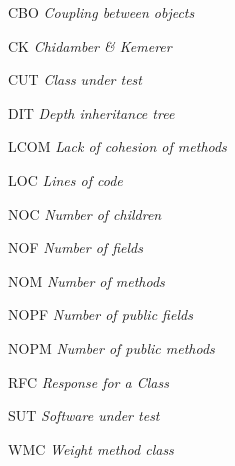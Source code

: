 \documentclass[
	12pt,				%
	oneside,			%
	a4paper,			%
	english,			%
	brazil				%
	]{abntex2ppgsi}
\begin{document}
\listofalgorithms
\cleardoublepage

\listofquadros*
\cleardoublepage


\listoftables*
\cleardoublepage

%
%
\begin{siglas}
  \item[CBO] \textit{Coupling between objects}
\item[CK] \textit{Chidamber \& Kemerer}
 \item[CUT] \textit{Class under test}
 \item[DIT] \textit{Depth inheritance tree}
 \item[LCOM] \textit{Lack of cohesion of methods}
 \item[LOC] \textit{Lines of code}
 \item[NOC] \textit{Number of children}
 \item[NOF] \textit{Number of fields}
 \item[NOM] \textit{Number of methods}
 \item[NOPF] \textit{Number of public fields}
 \item[NOPM] \textit{Number of public methods}
 \item[RFC] \textit{Response for a Class}
  \item[SUT] \textit{Software under test}
   \item[WMC] \textit{Weight method class}
\end{siglas}

%
% 
\end{document}
